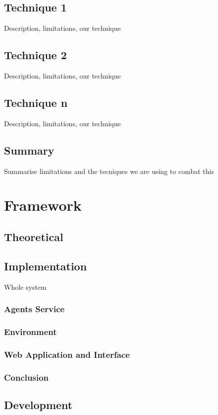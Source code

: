 \documentclass[]{final_report}
\begin{document}
\section{Technique 1}
Description, limitations, our technique

\section{Technique 2}
Description, limitations, our technique

\section{Technique n}
Description, limitations, our technique

\section{Summary}
Summarise limitations and the tecniques we are using to combat this

\chapter{Framework}
\section{Theoretical}

\section{Implementation}
Whole system
\subsection{Agents Service}
\subsection{Environment}
\subsection{Web Application and Interface}
\subsection{Conclusion}

\section{Development}
\end{document}
